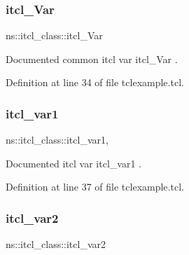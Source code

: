 \subsubsection{\texorpdfstring{itcl\_Var}{itcl\_Var}}
{\footnotesize\ttfamily ns\+::itcl\+\_\+class\+::itcl\+\_\+\+Var\hspace{0.3cm}{\ttfamily [static]}}



Documented common itcl var {\ttfamily itcl\+\_\+\+Var} . 



Definition at line 34 of file tclexample.\+tcl.


\begin{DoxyCode}{0}

\end{DoxyCode}
\mbox{\label{classns_1_1itcl__class_ae515e43ca6bb755d116416f94a13d344}} 
\subsubsection{\texorpdfstring{itcl\_var1}{itcl\_var1}}
{\footnotesize\ttfamily ns\+::itcl\+\_\+class\+::itcl\+\_\+var1\hspace{0.3cm}{\ttfamily [static]}, {\ttfamily [protected]}}



Documented itcl var {\ttfamily itcl\+\_\+var1} . 



Definition at line 37 of file tclexample.\+tcl.


\begin{DoxyCode}{0}

\end{DoxyCode}
\mbox{\label{classns_1_1itcl__class_abaf3c744194c1b3ae68fb0ba70d8786e}} 
\subsubsection{\texorpdfstring{itcl\_var2}{itcl\_var2}}
{\footnotesize\ttfamily ns\+::itcl\+\_\+class\+::itcl\+\_\+var2\hspace{0.3cm}{\ttfamily [static]}}



